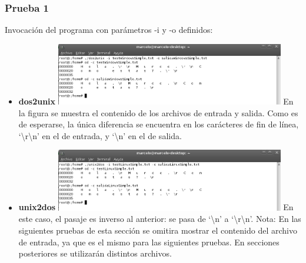 \documentclass[a4paper,10pt]{article}
\begin{document}
    \subsubsection{Prueba 1}
    Invocaci\'on del programa con par\'ametros -i y -o definidos:
    \begin{itemize}
      \item \textbf{dos2unix}
      \newline	
      \includegraphics[width=10cm, viewport=0 0 901 246]{../Informe/Imagenes/prueba1-invocacion-dos2unix.png}
      \newline
      En la figura se muestra el contenido de los archivos de entrada y salida. Como es de esperarse, la \'unica diferencia
      se encuentra en los car\'acteres de fin de l\'inea, `\textbackslash r\textbackslash n' en el de entrada, y `\textbackslash n' en el de salida.
      \item \textbf{unix2dos}
      \newline
      \includegraphics[width=10cm, viewport=0 0 899 246]{../Informe/Imagenes/prueba1-invocacion-unix2dos.png}
      \newline
      En este caso, el pasaje es inverso al anterior: se pasa de `\textbackslash n' a `\textbackslash r\textbackslash n'.	
      \newline
      Nota: En las siguientes pruebas de esta secci\'on se omitira mostrar el contenido del archivo de entrada, ya que es el mismo
      para las siguientes pruebas. En secciones posteriores se utilizar\'an distintos archivos.
    \end{itemize}
\end{document}
